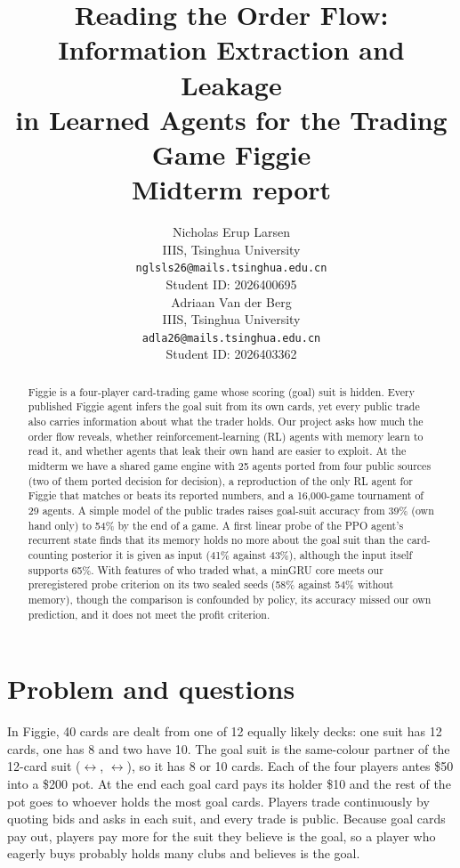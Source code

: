 \documentclass{article}
\title{Reading the Order Flow: Information Extraction and Leakage\\in Learned Agents for the Trading Game Figgie\\[4pt]\large Midterm report}
\author{%
  Nicholas Erup Larsen \\
  IIIS, Tsinghua University \\
  \texttt{nglsls26@mails.tsinghua.edu.cn} \\
  Student ID: 2026400695 \\
  \And
  Adriaan Van der Berg \\
  IIIS, Tsinghua University \\
  \texttt{adla26@mails.tsinghua.edu.cn} \\
  Student ID: 2026403362 \\
}
\newcommand{\Spade}{\ding{171}}
\newcommand{\Club}{\ding{168}}
\newcommand{\Heart}{\textcolor{red!75!black}{\ding{170}}}
\newcommand{\Diam}{\textcolor{red!75!black}{\ding{169}}}
\begin{document}
\maketitle

\begin{abstract}
Figgie is a four-player card-trading game whose scoring (goal) suit is hidden.
Every published Figgie agent infers the goal suit from its own cards, yet every public trade also carries information about what the trader holds.
Our project asks how much the order flow reveals, whether reinforcement-learning (RL) agents with memory learn to read it, and whether agents that leak their own hand are easier to exploit.
At the midterm we have a shared game engine with 25 agents ported from four public sources (two of them ported decision for decision), a reproduction of the only RL agent for Figgie that matches or beats its reported numbers, and a 16{,}000-game tournament of 29 agents.
A simple model of the public trades raises goal-suit accuracy from 39\% (own hand only) to 54\% by the end of a game.
A first linear probe of the PPO agent's recurrent state finds that its memory holds no more about the goal suit than the card-counting posterior it is given as input (41\% against 43\%), although the input itself supports 65\%.
With features of who traded what, a minGRU core meets our preregistered probe criterion on its two sealed seeds (58\% against 54\% without memory), though the comparison is confounded by policy, its accuracy missed our own prediction, and it does not meet the profit criterion.
\end{abstract}

\section{Problem and questions}
In Figgie, 40 cards are dealt from one of 12 equally likely decks: one suit has 12 cards, one has 8 and two have 10.
The goal suit is the same-colour partner of the 12-card suit (\Spade$\leftrightarrow$\Club, \Heart$\leftrightarrow$\Diam), so it has 8 or 10 cards.
Each of the four players antes \$50 into a \$200 pot. At the end each goal card pays its holder \$10 and the rest of the pot goes to whoever holds the most goal cards.
Players trade continuously by quoting bids and asks in each suit, and every trade is public.
Because goal cards pay out, players pay more for the suit they believe is the goal, so a player who eagerly buys \Club{} probably holds many clubs and believes \Club{} is the goal.
\end{document}
